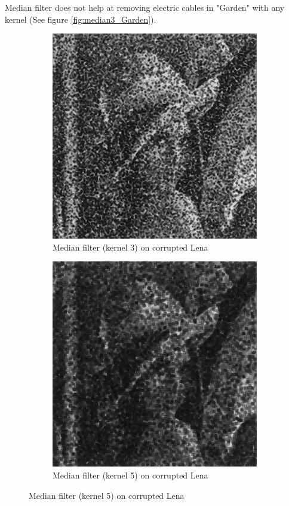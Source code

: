 \documentclass{article}
\begin{document}
Median filter does not help at removing electric cables in "Garden" with any kernel (See figure \ref{fig:median3_Garden}).
\begin{figure}[H]
	\centering
	\begin{subfigure}{0.4\textwidth}
		\includegraphics[width=\textwidth]{Generated/Lena_corrupted_median3filter.png}
		\caption{Median filter (kernel 3) on corrupted Lena}
		\label{fig:median3_Lena}
	\end{subfigure}
	\hfill
	\begin{subfigure}{0.4\textwidth}
		\includegraphics[width=\textwidth]{Generated/Lena_corrupted_median5filter.png}
		\caption{Median filter (kernel 5) on corrupted Lena}
		\label{fig:median5_Lena}
	\end{subfigure}


\end{figure}
\end{document}
